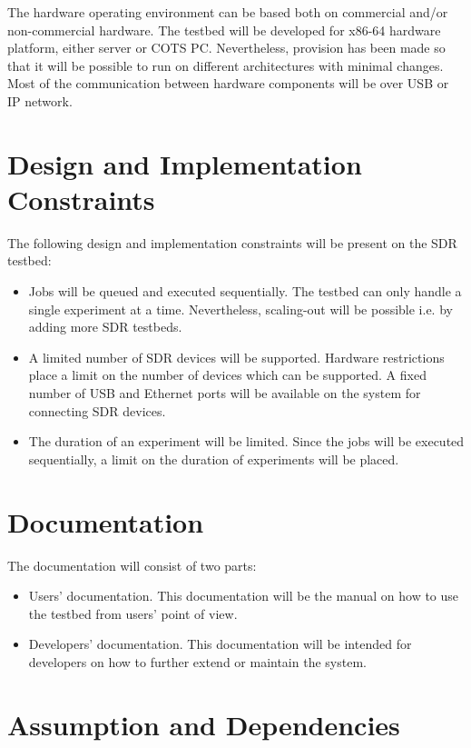 \documentclass[english,titlepage,a4paper]{report}
\begin{document}
The hardware operating environment can be based both on commercial and/or non-commercial hardware.
The testbed will be developed for x86-64 hardware platform, either server or COTS PC.
Nevertheless, provision has been made so that it will be possible to run on different architectures with minimal changes.
Most of the communication between hardware components will be over USB or IP network.

\section{Design and Implementation Constraints}

The following design and implementation constraints will be present on the SDR testbed:
\begin{itemize}
\item Jobs will be queued and executed sequentially.
  The testbed can only handle a single experiment at a time.
  Nevertheless, scaling-out will be possible i.e. by adding more SDR testbeds.
\item A limited number of SDR devices will be supported.
  Hardware restrictions place a limit on the number of devices which can be supported.
  A fixed number of USB and Ethernet ports will be available on the system for connecting SDR devices.
\item The duration of an experiment will be limited.
  Since the jobs will be executed sequentially, a limit on the duration of experiments will be placed.
\end{itemize}

\section{Documentation}

The documentation will consist of two parts:
\begin{itemize}
\item Users' documentation. This documentation will be the manual on how to use the testbed from users' point of view.
\item Developers' documentation. This documentation will be intended for developers on how to further extend or maintain the system.
\end{itemize}

\section{Assumption and Dependencies}
\end{document}
